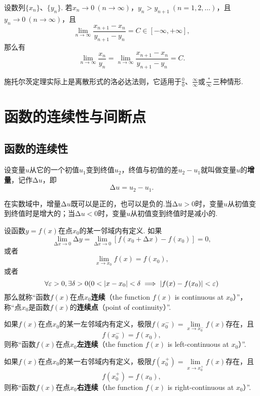 \begin{theorem}[施托尔茨定理II]\label{theorem:极限.施托尔茨定理2}
设数列\(\{x_n\}\)、\(\{y_n\}\).
若\(x_n\to0\ (n\to\infty)\)，\(y_n > y_{n+1}\ (n=1,2,\dotsc)\)，且\(y_n\to0\ (n\to\infty)\)，且\[
\lim\limits_{n\to\infty} \frac{x_{n+1}-x_n}{y_{n+1}-y_n} = C\in[-\infty,+\infty],
\]那么有\[
\lim\limits_{n\to\infty} \frac{x_n}{y_n}
= \lim\limits_{n\to\infty} \frac{x_{n+1}-x_n}{y_{n+1}-y_n}
= C.
\]
\end{theorem}

施托尔茨定理实际上是离散形式的洛必达法则，它适用于\(\frac{0}{0}\)、\(\frac{\infty}{\infty}\)或\(\frac{*}{\infty}\)三种情形.


\section{函数的连续性与间断点}

\subsection{函数的连续性}
\begin{definition}
设变量\(u\)从它的一个初值\(u_1\)变到终值\(u_2\)，终值与初值的差\(u_2 - u_1\)就叫做变量\(u\)的\textbf{增量}，记作\(\increment u\)，即\[
\increment u = u_2 - u_1.
\]
\end{definition}
在实数域中，增量\(\increment u\)既可以是正的，也可以是负的.当\(\increment u > 0\)时，变量\(u\)从初值变到终值时是增大的；当\(\increment u < 0\)时，变量\(u\)从初值变到终值时是减小的.

\begin{definition}\label{definition:极限.函数在一点的连续性}
设函数\(y=f(x)\)在点\(x_0\)的某一邻域内有定义.
如果\[
\lim\limits_{\increment x\to0} \increment y
=\lim\limits_{\increment x\to0} [f(x_0 + \increment x)-f(x_0)]
=0,
\]或者\[
\lim\limits_{x \to x_0} f(x) = f(x_0),
\]或者\[
\forall \varepsilon > 0,
\exists \delta > 0
( 0 < \abs{x - x_0} < \delta \implies \abs{f(x) - f(x_0)} < \varepsilon )
\]那么就称“函数\(f(x)\)在点\(x_0\)\textbf{连续}（the function \(f(x)\) is continuous at \(x_0\)）”，%
称“点\(x_0\)是函数\(f(x)\)的\textbf{连续点}（point of continuity）”.

如果\(f(x)\)在点\(x_0\)的某一左邻域内有定义，极限\(f(x_0^-) = \lim\limits_{x \to x_0^-} f(x)\)存在，且\[
f(x_0^-) = f(x_0),
\]则称“函数\(f(x)\)在点\(x_0\)\textbf{左连续}（the function \(f(x)\) is left-continuous at \(x_0\)）”.

如果\(f(x)\)在点\(x_0\)的某一右邻域内有定义，极限\(f(x_0^+) = \lim\limits_{x \to x_0^+} f(x)\)存在，且\[
f(x_0^+) = f(x_0),
\]则称“函数\(f(x)\)在点\(x_0\)\textbf{右连续}（the function \(f(x)\) is right-continuous at \(x_0\)）”.
\end{definition}

